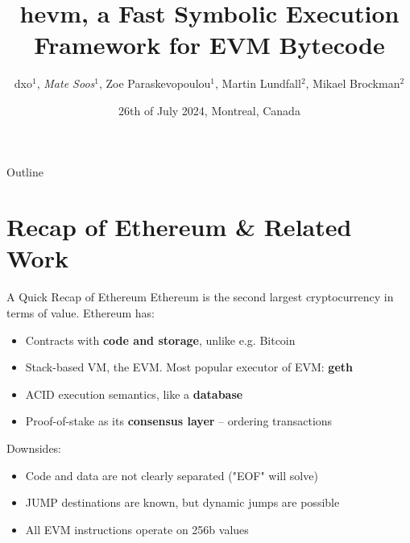 \documentclass[aspectratio=169]{beamer}
\title{hevm, a Fast Symbolic Execution Framework for EVM Bytecode}
\author{dxo$^{1}$, \emph{Mate Soos$^{1}$}, Zoe Paraskevopoulou$^{1}$, Martin Lundfall$^{2}$, Mikael Brockman$^{2}$}
\institute{$^{1}$ Ethereum Foundation, $^{2}$ Independent Researcher}
\date{26th of July 2024, Montreal, Canada}
\begin{document}
\begin{frame}
    \titlepage 
\end{frame}

%

\begin{frame}{Outline}
    \tableofcontents
\end{frame}



\section{Recap of Ethereum \& Related Work}

\begin{frame}{A Quick Recap of Ethereum}
Ethereum is the second largest cryptocurrency in terms of value. Ethereum has:
\begin{itemize}
\item Contracts with \textbf{code and storage}, unlike e.g. Bitcoin
\item Stack-based VM, the EVM. Most popular executor of EVM: \textbf{geth}
\item ACID execution semantics, like a \textbf{database}
\item Proof-of-stake as its \textbf{consensus layer} -- ordering transactions
\end{itemize}

Downsides:
\begin{itemize}
\item Code and data are not clearly separated ("EOF" will solve)
\item JUMP destinations are known, but dynamic jumps are possible
\item All EVM instructions operate on 256b values
\end{itemize}

\end{frame}
\end{document}
